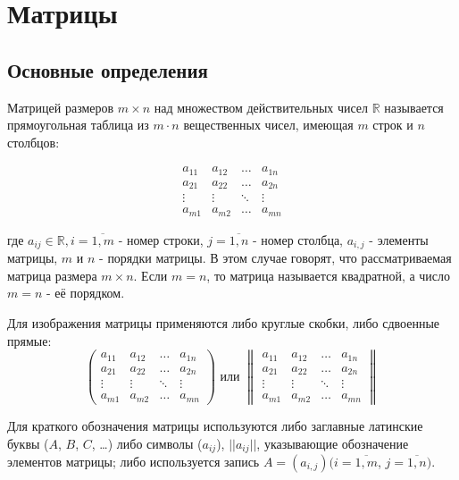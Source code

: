 \section{Матрицы}
\subsection{Основные определения}

\begin{definition}
  Матрицей размеров $m \times n$ над множеством действительных чисел $\mathds{R}$
  называется прямоугольная таблица из $m \cdot n$ вещественных чисел, имеющая $m$ строк и $n$ столбцов:

  \[ \begin{array}{cccc}
    a_{11}& a_{12} &\ldots & a_{1n}\\
    a_{21}& a_{22} &\ldots & a_{2n}\\
    \vdots& \vdots &\ddots & \vdots\\
    a_{m1}& a_{m2} &\ldots & a_{mn}
  \end{array} \]

  где $a_{ij} \in \mathds{R}, i = \overline{1, m}$ - номер строки,
    $j = \overline{1, n}$ - номер столбца, $a_{i,j}$ - элементы матрицы, $m$ и $n$ - порядки матрицы.
  В этом случае говорят, что рассматриваемая матрица размера $m \times n$.
  Если $m = n$, то матрица называется квадратной, а число $m = n$ - её порядком.
\end{definition}

Для изображения матрицы применяются либо круглые скобки, либо сдвоенные прямые:
  \[ \left( \begin{array}{cccc}
    a_{11}& a_{12} &\ldots & a_{1n}\\
    a_{21}& a_{22} &\ldots & a_{2n}\\
    \vdots& \vdots &\ddots & \vdots\\
    a_{m1}& a_{m2} &\ldots & a_{mn}
  \end{array} \right)
  \text{ или }
  \begin{Vmatrix}
    a_{11}& a_{12} &\ldots & a_{1n}\\
    a_{21}& a_{22} &\ldots & a_{2n}\\
    \vdots& \vdots &\ddots & \vdots\\
    a_{m1}& a_{m2} &\ldots & a_{mn}
    \end{Vmatrix}
  \]

Для краткого обозначения матрицы используются либо заглавные латинские буквы ($A$, $B$, $C$, \dots)
либо символы ($a_{ij}$), $||a_{ij}||$, указывающие обозначение элементов матрицы;
либо используется запись
$A = (a_{i,j})(i = \overline{1,m}$, $j = \overline{1,n})$.

